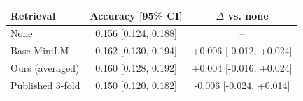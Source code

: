 \begin{tabular}{lcc}
\toprule
Retrieval & Accuracy [95\% CI] & $\Delta$ vs. none \\
\midrule
None & 0.156 [0.124, 0.188] & -- \\
Base MiniLM & 0.162 [0.130, 0.194] & +0.006 [-0.012, +0.024] \\
Ours (averaged) & 0.160 [0.128, 0.192] & +0.004 [-0.016, +0.024] \\
Published 3-fold & 0.150 [0.120, 0.182] & -0.006 [-0.024, +0.014] \\
\bottomrule
\end{tabular}
